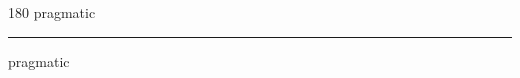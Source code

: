 
\begin{frame}
\begin{center}
\begin{turn}{180}
{\fontsize{2.5cm}{1em}\selectfont pragmatic}
\end{turn}
\vspace{1em}\par  
\hrule
\vspace{1em}\par  
{\fontsize{2.5cm}{1em}\selectfont pragmatic}
\end{center}
\end{frame}
